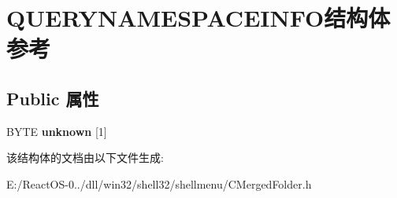 \hypertarget{struct_q_u_e_r_y_n_a_m_e_s_p_a_c_e_i_n_f_o}{}\section{Q\+U\+E\+R\+Y\+N\+A\+M\+E\+S\+P\+A\+C\+E\+I\+N\+F\+O结构体 参考}
\label{struct_q_u_e_r_y_n_a_m_e_s_p_a_c_e_i_n_f_o}
\subsection*{Public 属性}
\begin{DoxyCompactItemize}
\item 
\mbox{\label{struct_q_u_e_r_y_n_a_m_e_s_p_a_c_e_i_n_f_o_a1a64afb359a968d9f19a5391f959eed2}} 
B\+Y\+TE {\bfseries unknown} \mbox{[}1\mbox{]}
\end{DoxyCompactItemize}


该结构体的文档由以下文件生成\+:\begin{DoxyCompactItemize}
\item 
E\+:/\+React\+O\+S-\/0../dll/win32/shell32/shellmenu/C\+Merged\+Folder.\+h\end{DoxyCompactItemize}
